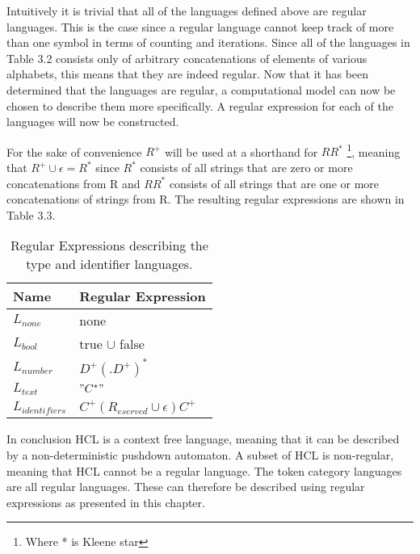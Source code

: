 Intuitively it is trivial that all of the languages defined above are regular languages.
This is the case since a regular language cannot keep track of more than one symbol in terms of counting and iterations.
Since all of the languages in Table 3.2 consists only of arbitrary concatenations of elements of various alphabets, this means that they are indeed regular. 
Now that it has been determined that the languages are regular, a computational model can now be chosen to describe them more specifically.
A regular expression for each of the languages will now be constructed.

For the sake of convenience $R^+$ will be used at a shorthand for $RR^*$ \footnote{Where * is Kleene star}, meaning that $R^+ \cup \epsilon = R^*$ since $R^*$ consists of all strings that are zero or more concatenations from R and $RR^*$ consists of all strings that are one or more concatenations of strings from R.
The resulting regular expressions are shown in Table 3.3.

\begin{table}[!htb]
	\centering
	\label{my-label}
	\begin{tabular}{|l|l|}
		\hline
		\textbf{Name}     & \textbf{Regular Expression}         \\ \hline
		$L_{none}$        & none                                \\ \hline
		$L_{bool}$        & true $\cup$ false                   \\ \hline
		$L_{number}$      & $D^+(.D^+)^*$                       \\ \hline
		$L_{text}$        & $"C^*"$                               \\ \hline
		$L_{identifiers}$ & $C^+(R_{eserved} \cup \epsilon)C^+$ \\ \hline
	\end{tabular}
	\caption{Regular Expressions describing the type and identifier languages.}
\end{table}

In conclusion HCL is a context free language, meaning that it can be described by a non-deterministic pushdown automaton.
A subset of HCL is non-regular, meaning that HCL cannot be a regular language.
The token category languages are all regular languages. These can therefore be described using regular expressions as presented in this chapter.



